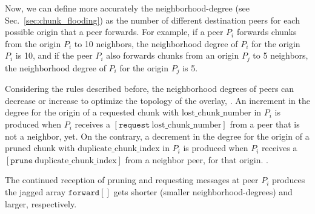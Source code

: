 Now, we can define more accurately the \gls{neighborhood-degree} (see
Sec.~\ref{sec:chunk_flooding}) as the number of different destination
peers for each possible origin that a peer forwards. For example, if a
peer $P_i$ forwards chunks from the origin $P_i$ to 10 neighbors, the
neighborhood degree of $P_i$ for the origin $P_i$ is 10, and if the
peer $P_i$ also forwards chunks from an origin $P_j$ to 5 neighbors,
the neighborhood degree of $P_i$ for the origin $P_j$ is 5.

Considering the rules described before, the neighborhood degrees of
peers can decrease or increase to optimize the topology of the
overlay, . An increment in the degree for the origin of a requested
chunk with $\text{lost\_chunk\_number}$ in $P_i$ is produced when $P_i$
receives a $[\mathtt{request}~\text{lost\_chunk\_number}]$ from a peer
that is not a neighbor, yet.  On the contrary, a decrement in the
degree for the origin of a pruned chunk with 
$\text{duplicate\_chunk\_index}$ in $P_i$ is produced when $P_i$
receives a $[\mathtt{prune}~\text{duplicate\_chunk\_index}]$ from a
neighbor peer, for that origin. . 

The continued reception of pruning and requesting messages at peer $P_i$ produces the jagged array
$\mathtt{forward}[]$ gets shorter (smaller \gls{neighborhood-degree}s) and larger, respectively.
